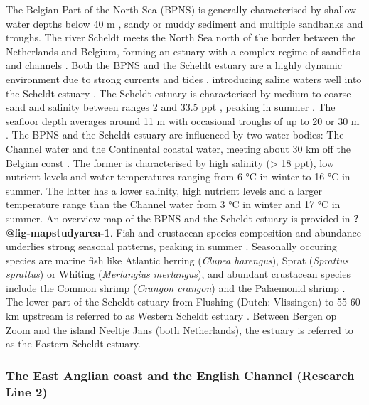 \documentclass[
  authoryear,
  review,
  3p]{elsarticle}
\begin{document}
The Belgian Part of the North Sea (BPNS) is generally characterised by
shallow water depths below 40 m \citep{thierry_2019}, sandy or muddy
sediment \citep{wolff_1973, vasquez_2021} and multiple sandbanks and
troughs. The river Scheldt meets the North Sea north of the border
between the Netherlands and Belgium, forming an estuary with a complex
regime of sandflats and channels \citep{claessens_1988}. Both the BPNS
and the Scheldt estuary are a highly dynamic environment due to strong
currents and tides \citep{otto_1990}, introducing saline waters well
into the Scheldt estuary \citep{ouboter_1998}. The Scheldt estuary is
characterised by medium to coarse sand and salinity between ranges 2 and
33.5 ppt \citep{baeyens_1998}, peaking in summer \citep{maes_1998}. The
seafloor depth averages around 11 m with occasional troughs of up to 20
or 30 m \citep{thierry_2019}. The BPNS and the Scheldt estuary are
influenced by two water bodies: The Channel water and the Continental
coastal water, meeting about 30 km off the Belgian coast
\citep{wolff_1973}. The former is characterised by high salinity
(\textgreater{} 18 ppt), low nutrient levels and water temperatures
ranging from 6 °C in winter to 16 °C in summer. The latter has a lower
salinity, high nutrient levels and a larger temperature range than the
Channel water from 3 °C in winter and 17 °C in summer. An overview map
of the BPNS and the Scheldt estuary is provided in
\textbf{?@fig-mapstudyarea-1}. Fish and crustacean species composition
and abundance underlies strong seasonal patterns, peaking in summer
\citep{maes_1998, maes_2005}. Seasonally occuring species are marine
fish like Atlantic herring (\emph{Clupea harengus}), Sprat
(\emph{Sprattus sprattus}) or Whiting (\emph{Merlangius merlangus}), and
abundant crustacean species include the Common shrimp (\emph{Crangon
crangon}) and the Palaemonid shrimp \citep[\emph{Palaemon
varians},][]{maes_1998}. The lower part of the Scheldt estuary from
Flushing (Dutch: Vlissingen) to 55-60 km upstream is referred to as
Western Scheldt estuary \citep{baeyens_1998, ouboter_1998}. Between
Bergen op Zoom and the island Neeltje Jans (both Netherlands), the
estuary is referred to as the Eastern Scheldt estuary.

\hypertarget{sec-mmstudyareaec}{%
\subsubsection{The East Anglian coast and the English Channel (Research
Line 2)}\label{sec-mmstudyareaec}}
\end{document}

